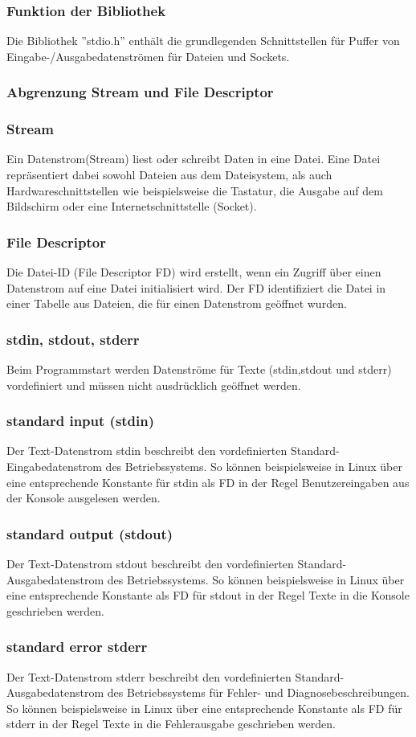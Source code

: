 \documentclass[numbers=noendperiod]{scrartcl}
\begin{document}
\subsubsection{Funktion der Bibliothek}
Die Bibliothek ''stdio.h'' enthält die grundlegenden Schnittstellen für Puffer von Eingabe-/Ausgabedatenströmen für Dateien und Sockets.
\subsubsection{Abgrenzung Stream und File Descriptor}
\subsubsection*{Stream}
Ein Datenstrom(Stream) liest oder schreibt Daten in eine Datei. Eine Datei repräsentiert dabei sowohl Dateien aus dem Dateisystem, als auch Hardwareschnittstellen wie beispielsweise die Tastatur, die Ausgabe auf dem Bildschirm oder eine Internetschnittstelle (Socket). 
\subsubsection*{File Descriptor}
Die Datei-ID (File Descriptor FD) wird erstellt, wenn ein Zugriff über einen Datenstrom auf eine Datei initialisiert wird. Der FD identifiziert die Datei in einer Tabelle aus Dateien, die für einen Datenstrom geöffnet wurden. 
\subsubsection{stdin, stdout, stderr}
Beim Programmstart werden Datenströme für Texte (stdin,stdout und stderr) vordefiniert und müssen nicht ausdrücklich geöffnet werden.
\subsubsection*{standard input (stdin)}
Der Text-Datenstrom stdin beschreibt den vordefinierten Standard-Eingabedatenstrom des Betriebssystems. So können beispielsweise in Linux über eine entsprechende Konstante für stdin als FD in der Regel Benutzereingaben aus der Konsole ausgelesen werden.
\subsubsection*{standard output (stdout)}
Der Text-Datenstrom stdout beschreibt den vordefinierten Standard-Ausgabedatenstrom des Betriebssystems. So können beispielsweise in Linux über eine entsprechende Konstante als FD für stdout in der Regel Texte in die Konsole geschrieben werden.
\subsubsection*{standard error stderr}
Der Text-Datenstrom stderr beschreibt den vordefinierten Standard-Ausgabedatenstrom des Betriebssystems für Fehler- und Diagnosebeschreibungen. So können beispielsweise in Linux über eine entsprechende Konstante als FD für stderr in der Regel Texte in die Fehlerausgabe geschrieben werden.
\end{document}
